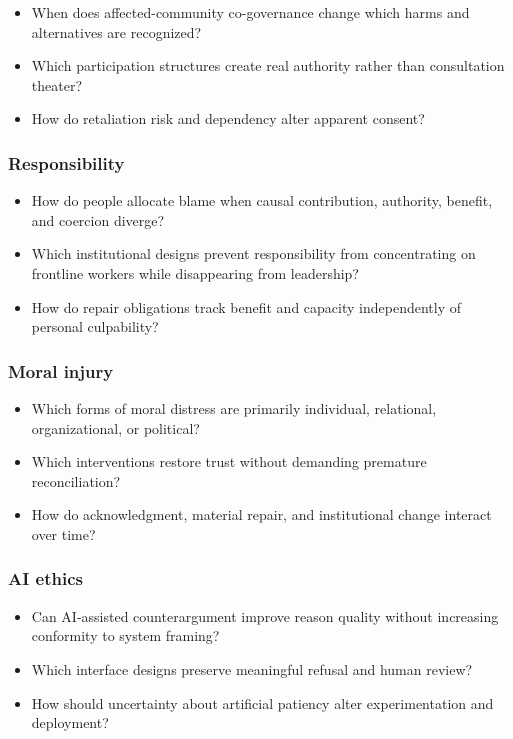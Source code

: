 \documentclass[
  11pt,
]{article}
\providecommand{\tightlist}{%
  \setlength{\itemsep}{0pt}\setlength{\parskip}{0pt}}
\begin{document}
\begin{itemize}
\tightlist
\item
  When does affected-community co-governance change which harms and
  alternatives are recognized?
\item
  Which participation structures create real authority rather than
  consultation theater?
\item
  How do retaliation risk and dependency alter apparent consent?
\end{itemize}

\subsubsection{Responsibility}\label{responsibility}

\begin{itemize}
\tightlist
\item
  How do people allocate blame when causal contribution, authority,
  benefit, and coercion diverge?
\item
  Which institutional designs prevent responsibility from concentrating
  on frontline workers while disappearing from leadership?
\item
  How do repair obligations track benefit and capacity independently of
  personal culpability?
\end{itemize}

\subsubsection{Moral injury}\label{moral-injury}

\begin{itemize}
\tightlist
\item
  Which forms of moral distress are primarily individual, relational,
  organizational, or political?
\item
  Which interventions restore trust without demanding premature
  reconciliation?
\item
  How do acknowledgment, material repair, and institutional change
  interact over time?
\end{itemize}

\subsubsection{AI ethics}\label{ai-ethics}

\begin{itemize}
\tightlist
\item
  Can AI-assisted counterargument improve reason quality without
  increasing conformity to system framing?
\item
  Which interface designs preserve meaningful refusal and human review?
\item
  How should uncertainty about artificial patiency alter experimentation
  and deployment?
\end{itemize}
\end{document}
